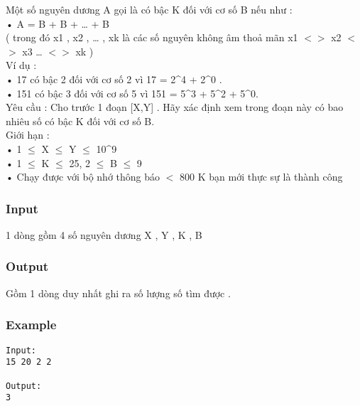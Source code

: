 



   Một số nguyên dương A gọi là có bậc K đối với cơ số B nếu như :   
\\   • A = B + B + … + B\textasciicircumxk   
\\   ( trong đó x1 , x2 , … , xk là các số nguyên không âm thoả mãn x1 $<$$>$ x2 $<$$>$ x3 … $<$$>$ xk )   
\\   Ví dụ :   
\\   • 17 có bậc 2 đối với cơ số 2 vì 17 = 2\textasciicircum4 + 2\textasciicircum0 .   
\\   • 151 có bậc 3 đối với cơ số 5 vì 151 = 5\textasciicircum3 + 5\textasciicircum2 + 5\textasciicircum0.   
\\   Yêu cầu : Cho trước 1 đoạn [X,Y] . Hãy xác định xem trong đoạn này có bao nhiêu số có bậc K đối với cơ số B.   
\\   Giới hạn :   
\\   • 1  $\le$  X  $\le$  Y  $\le$  10\textasciicircum9   
\\   • 1  $\le$  K  $\le$  25, 2  $\le$  B  $\le$  9   
\\   • Chạy được với bộ nhớ thông báo $<$ 800 K bạn mới thực sự là thành công   
\\

\subsubsection{   Input  }

   1 dòng gồm 4 số nguyên dương X , Y , K , B  

\subsubsection{   Output  }

   Gồm 1 dòng duy nhất ghi ra số lượng số tìm được .  

\subsubsection{   Example  }
\begin{verbatim}
Input:
15 20 2 2

Output:
3 
\end{verbatim}
